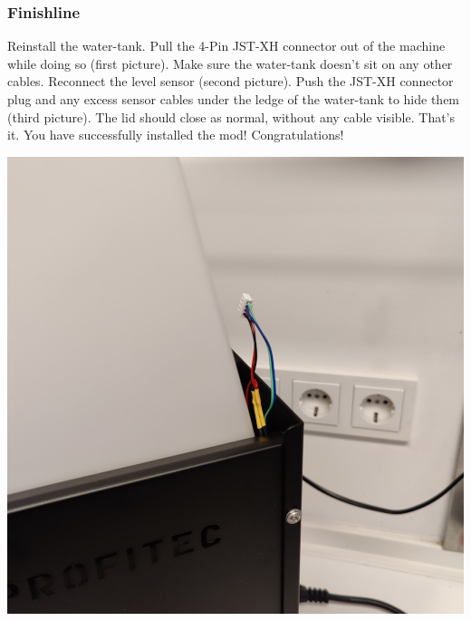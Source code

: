 \documentclass[]{article}
\begin{document}
\subsubsection{Finishline}
\begin{minipage}[t]{0.5\linewidth}
	\vspace{0pt}
	Reinstall the water-tank. Pull the 4-Pin JST-XH connector out of the machine while doing so (first picture). Make sure the water-tank doesn't sit on any other cables. Reconnect the level sensor (second picture). Push the JST-XH connector plug and any excess sensor cables under the ledge of the water-tank to hide them (third picture). The lid should close as normal, without any cable visible. That's it. You have successfully installed the mod! Congratulations!
\end{minipage}
\hfill
\begin{minipage}[t]{0.4\linewidth}
	\vspace{0pt}
	\includegraphics[width=\linewidth]{images/03_installation/21_reinstall_back_watertank.jpg}

\end{minipage}
\end{document}
